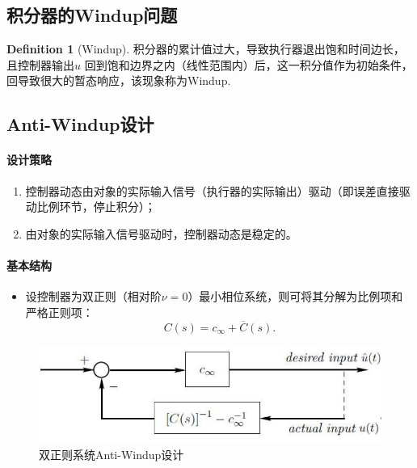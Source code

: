 \documentclass[14pt,a4paper]{article}
\theoremstyle{plain}
\theoremstyle{definition}
\newtheorem*{dfn}{Definition}
\theoremstyle{remark}
\theoremstyle{plain}
\theoremstyle{plain}
\theoremstyle{definition}
\begin{document}
		\subsection{积分器的Windup问题}%
		\label{sub:积分器的windup问题}
		
			\begin{dfn}[Windup]  
			\label{dfn:windup}
				积分器的累计值过大，导致执行器退出饱和时间边长，且控制器输出$\hat{u}$ 回到饱和边界之内（线性范围内）后，这一积分值作为初始条件，回导致很大的暂态响应，该现象称为Windup. 
			\end{dfn} 

		\subsection{Anti-Windup设计}%
		\label{sub:anti_windup设计}
		
			\paragraph{设计策略}%
			\label{par:设计策略}
			
				\begin{enumerate}
					\item 控制器动态由对象的实际输入信号（执行器的实际输出）驱动（即误差直接驱动比例环节，停止积分）；
					\item 由对象的实际输入信号驱动时，控制器动态是稳定的。
				\end{enumerate} 

			\paragraph{基本结构}%
			\label{par:基本结构}
			
				\begin{itemize}
					\item 设控制器为双正则（相对阶$\nu=0$）最小相位系统，则可将其分解为比例项和严格正则项：
						\[
							C(s) = c_\infty + \overline{C}(s)
						.\] 
				\end{itemize}

				\begin{figure}[H]
					\centering
					\includegraphics[width=\textwidth]{./figures/anti-windup.jpg} 
					\caption{双正则系统Anti-Windup设计}
					\label{fig:anti-windup}
				\end{figure}
\end{document}
